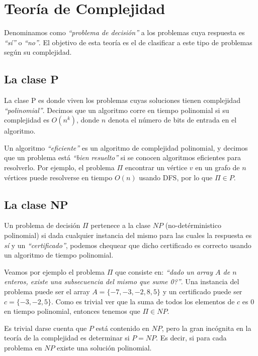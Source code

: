 \newpage
\section{Teor\'ia de Complejidad}

Denominamos como \emph{``problema de decisi\'on''} a los problemas cuya respuesta es \emph{``s\'i''} o \emph{``no''}. El objetivo de esta teor\'ia es el de clasificar a este tipo de problemas seg\'un su complejidad.

\subsection{La clase P}

La clase P es donde viven los problemas cuyas soluciones tienen complejidad \emph{``polinomial''}. Decimos que un algoritmo corre en tiempo polinomial si su complejidad es $O(n^k)$, donde $n$ denota el n\'umero de bits de entrada en el algoritmo.

Un algoritmo \emph{``eficiente''} es un algoritmo de complejidad polinomial, y decimos que un problema est\'a \emph{``bien resuelto''} si se conocen algoritmos eficientes para resolverlo. Por ejemplo, el problema $\Pi$ encontrar un v\'ertice $v$ en un grafo de $n$ v\'ertices puede resolverse en tiempo $O(n)$ usando DFS, por lo que $\Pi \in P$.

\subsection{La clase NP}

Un problema de decisi\'on $\Pi$ pertenece a la clase $NP$ (no-det\'erministico polinomial) si dada cualquier instancia del mismo para las cuales la respuesta es \emph{s\'i} y un \emph{``certificado''}, podemos chequear que dicho certificado es correcto usando un algoritmo de tiempo polinomial.

Veamos por ejemplo el problema $\Pi$ que consiste en: \emph{``dado un array $A$ de $n$ enteros, existe una subsecuencia del mismo que sume 0?''}. Una instancia del problema puede ser el array $A = \{-7, -3, -2, 8, 5\}$ y un certificado puede ser $c = \{-3, -2, 5\}$. Como es trivial ver que la suma de todos los elementos de $c$ es $0$ en tiempo polinomial, entonces tenemos que $\Pi \in NP$.

Es trivial darse cuenta que $P$ est\'a contenido en $NP$, pero la gran inc\'ognita en la teor\'ia de la complejidad es determinar si $P = NP$. Es decir, si para cada problema en $NP$ existe una soluci\'on polinomial.


